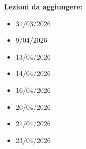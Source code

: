 \documentclass[a4paper, 11pt]{report}
\begin{document}
\textbf{Lezioni da aggiungere:}
\begin{itemize}
    \item 31/03/2026
    \item 9/04/2026
    \item 13/04/2026
    \item 14/04/2026
    \item 16/04/2026
    \item 20/04/2026
    \item 21/04/2026
    \item 23/04/2026
\end{itemize}
\end{document}
